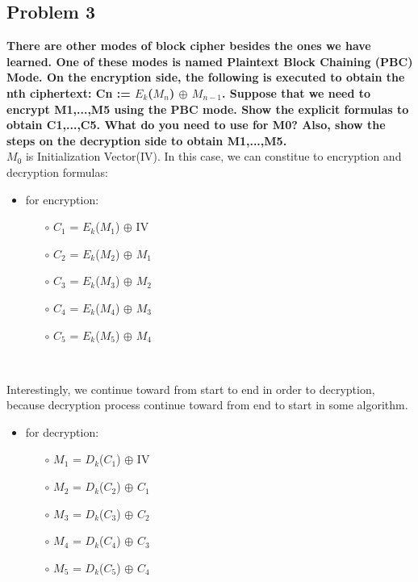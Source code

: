 \documentclass[11pt]{article}
\begin{document}
\newpage
\subsection{Problem 3}
\textbf{There are other modes of block cipher besides the ones we have learned. One of these modes
is named Plaintext Block Chaining (PBC) Mode. On the encryption side, the following is
executed to obtain the nth ciphertext: Cn := $E_{k}$($M_{n}$) $\oplus$  $M_{n-1}$. Suppose that we need to
encrypt M1,...,M5 using the PBC mode. Show the explicit formulas to obtain C1,...,C5.
What do you need to use for M0? Also, show the steps on the decryption side to obtain
M1,...,M5.}\\

$M_{0}$ is Initialization Vector(IV). In this case, we can constitue to encryption and decryption formulas: \\

  \begin{itemize}
    \item for encryption:
    \begin{itemize}
      \item[$\circ$] $C_{1}$ = $E_{k}$($M_{1}$) $\oplus$ IV
      \item[$\circ$] $C_{2}$ = $E_{k}$($M_{2}$) $\oplus$ $M_{1}$
      \item[$\circ$] $C_{3}$ = $E_{k}$($M_{3}$) $\oplus$ $M_{2}$
      \item[$\circ$] $C_{4}$ = $E_{k}$($M_{4}$) $\oplus$ $M_{3}$
      \item[$\circ$] $C_{5}$ = $E_{k}$($M_{5}$) $\oplus$ $M_{4}$
    \end{itemize}\
  \end{itemize}

Interestingly, we  continue toward  from start to end in order to decryption, because decryption process continue toward 
from end to start in some algorithm.

\begin{itemize}
  \item for decryption:
  \begin{itemize}
    \item[$\circ$] $M_{1}$ = $D_{k}$($C_{1}$) $\oplus$ IV
    \item[$\circ$] $M_{2}$ = $D_{k}$($C_{2}$) $\oplus$ $C_{1}$
    \item[$\circ$] $M_{3}$ = $D_{k}$($C_{3}$) $\oplus$ $C_{2}$
    \item[$\circ$] $M_{4}$ = $D_{k}$($C_{4}$) $\oplus$ $C_{3}$
    \item[$\circ$] $M_{5}$ = $D_{k}$($C_{5}$) $\oplus$ $C_{4}$
  \end{itemize}
\end{itemize}
\end{document}
